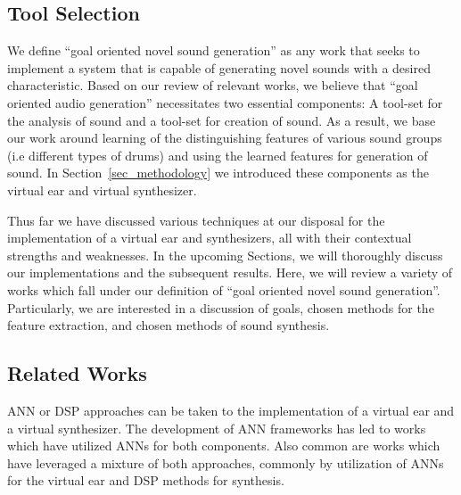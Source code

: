\documentclass[\main/thesis.tex]{subfiles}
\begin{document}
\subsection{Tool Selection}
We define \enquote{goal oriented novel sound generation} as any work that seeks to implement a system that is capable of generating novel sounds with a desired characteristic. Based on our review of relevant works, we believe that \enquote{goal oriented audio generation} necessitates two essential components: A tool-set for the analysis of sound and a tool-set for creation of sound. As a result, we base our work around learning of the distinguishing features of various sound groups (i.e different types of drums) and using the learned features for generation of sound. In Section~\ref{sec_methodology} we introduced these components as the virtual ear and virtual synthesizer. 

 Thus far we have discussed various techniques at our disposal for the implementation of a virtual ear and synthesizers, all with their contextual strengths and weaknesses. In the upcoming Sections, we will thoroughly discuss our implementations and the subsequent results. Here, we will review a variety of works which fall under our definition of \enquote{goal oriented novel sound generation}. Particularly, we are interested in a discussion of goals, chosen methods for the feature extraction, and chosen methods of sound synthesis. 

\subsection{Related Works}
ANN or DSP approaches can be taken to the implementation of a virtual ear and a virtual synthesizer. The development of ANN frameworks has led to works which have utilized ANNs for both components. Also common are works which have leveraged a mixture of both approaches, commonly by utilization of ANNs for the virtual ear and DSP methods for synthesis.
\end{document}

